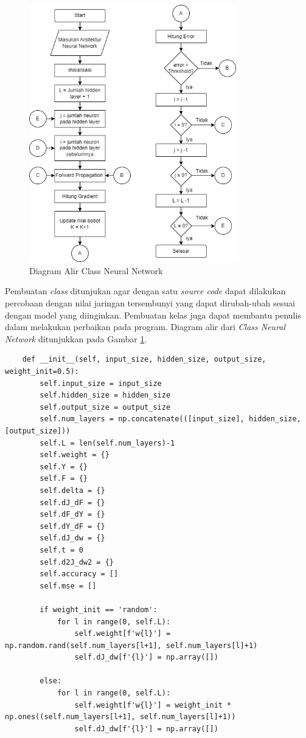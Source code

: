 \begin{figure}[H]
    \centering
    \includegraphics[width=9cm]{contents/chapter-3/Diagram Alir class.drawio.png}
    \caption{Diagram Alir Class Neural Network}
    \label{fig:Flowchart Class}
\end{figure}

Pembuatan \textit{class} ditunjukan agar dengan satu \textit{source code} dapat dilakukan percobaan dengan nilai jaringan tersembunyi yang dapat dirubah-ubah sesuai dengan model yang diinginkan. Pembuatan kelas juga dapat membantu penulis dalam melakukan perbaikan pada program. Diagram alir dari \textit{Class Neural Network} ditunjukkan pada Gambar \ref{fig:Flowchart Class}. 
\begin{lstlisting}
    def __init__(self, input_size, hidden_size, output_size, weight_init=0.5):
        self.input_size = input_size
        self.hidden_size = hidden_size
        self.output_size = output_size
        self.num_layers = np.concatenate(([input_size], hidden_size, [output_size]))
        self.L = len(self.num_layers)-1
        self.weight = {}
        self.Y = {}
        self.F = {}
        self.delta = {}
        self.dJ_dF = {}
        self.dF_dY = {}
        self.dY_dF = {}
        self.dJ_dw = {}
        self.t = 0
        self.d2J_dw2 = {}
        self.accuracy = []
        self.mse = []

        if weight_init == 'random':
            for l in range(0, self.L):
                self.weight[f'w{l}'] = np.random.rand(self.num_layers[l+1], self.num_layers[l]+1)
                self.dJ_dw[f'{l}'] = np.array([])

        else:
            for l in range(0, self.L):
                self.weight[f'w{l}'] = weight_init * np.ones((self.num_layers[l+1], self.num_layers[l]+1))
                self.dJ_dw[f'{l}'] = np.array([])
\end{lstlisting}


